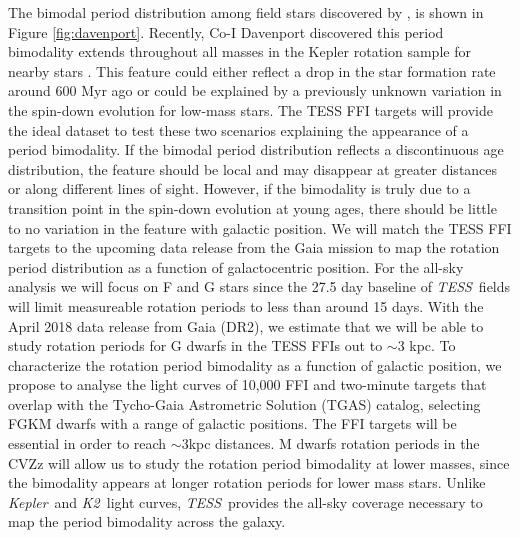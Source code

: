 \documentclass[letterpaper,12pt,preprint]{hack_aastex}
\newcommand{\Kepler}{{\it Kepler}}
\newcommand{\kepler}{\Kepler}
\newcommand{\Ktwo}{{\it K2}}
\newcommand{\ktwo}{\Ktwo}
\newcommand{\TESS}{{\it TESS}}
\begin{document}
The bimodal period distribution among field stars discovered by
\citet{mcquillan2013}, is shown in Figure \ref{fig:davenport}.
Recently, Co-I Davenport discovered this period bimodality extends throughout
all masses in the Kepler rotation sample for nearby stars
\citep{davenport2017}.
This feature could either reflect a drop in the star formation rate around 600
Myr ago or could be explained by a previously unknown variation in the
spin-down evolution for low-mass stars.
The TESS FFI targets will provide the ideal dataset to test these two
scenarios explaining the appearance of a period bimodality.
If the bimodal period distribution reflects a discontinuous age distribution,
the feature should be local and may disappear at greater distances or along
different lines of sight.
However, if the bimodality is truly due to a transition point in the spin-down
evolution at young ages, there should be little to no variation in the feature
with galactic position.
We will match the TESS FFI targets to the upcoming data
release from the Gaia mission \citep{perryman2001} to map the rotation period
distribution as a function of galactocentric position.
For the all-sky analysis we will focus on F and G stars since the 27.5 day
baseline of \TESS\ fields will limit measureable rotation periods to less than
around 15 days.
With the April 2018 data release from Gaia (DR2), we estimate that we will be
able to study rotation periods for G dwarfs in the TESS FFIs out to $\sim$3
kpc.
To characterize the rotation period bimodality as a function of galactic
position, we propose to analyse the light curves of 10,000 FFI and two-minute
targets that overlap with the Tycho-Gaia Astrometric Solution (TGAS) catalog,
selecting FGKM dwarfs with a range of galactic positions.
The FFI targets will be essential in order to reach $\sim$3kpc distances.
M dwarfs rotation periods in the CVZz will allow us to study the rotation
period bimodality at lower masses, since the bimodality appears at longer
rotation periods for lower mass stars.
Unlike \kepler\ and \ktwo\ light curves, \TESS\ provides the all-sky coverage
necessary to map the period bimodality across the galaxy.

\end{document}
